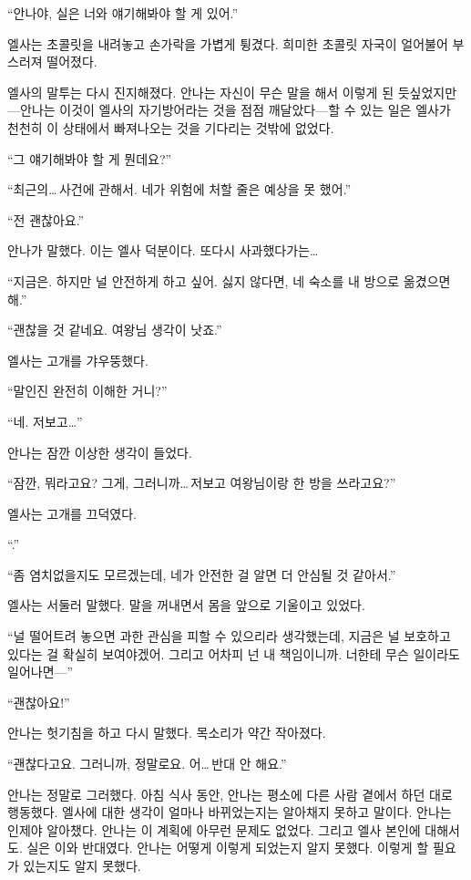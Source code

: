 ``안나야, 실은 너와 얘기해봐야 할 게 있어.''

엘사는 초콜릿을 내려놓고 손가락을 가볍게 튕겼다. 희미한 초콜릿 자국이 얼어불어 부스러져 떨어졌다.

엘사의 말투는 다시 진지해졌다. 안나는 자신이 무슨 말을 해서 이렇게 된 듯싶었지만—안나는 이것이 엘사의 자기방어라는 것을 점점 깨달았다—할 수 있는 일은 엘사가 천천히 이 상태에서 빠져나오는 것을 기다리는 것밖에 없었다.

``그 얘기해봐야 할 게 뭔데요?''

``최근의\ldots\,사건에 관해서. 네가 위험에 처할 줄은 예상을 못 했어.''

``전 괜찮아요.''

안나가 말했다. 이는 엘사 덕분이다. 또다시 사과했다가는\ldots

``지금은. 하지만 널 안전하게 하고 싶어. 싫지 않다면, 네 숙소를 내 방으로 옮겼으면 해.''

``괜찮을 것 같네요. 여왕님 생각이 낫죠.''

엘사는 고개를 갸우뚱했다.

`` 말인진 완전히 이해한 거니?''

``네. 저보고\ldots''

안나는 잠깐 이상한 생각이 들었다.

``잠깐, 뭐라고요? 그게, 그러니까\ldots\,저보고 여왕님이랑 한 방을 쓰라고요?''

엘사는 고개를 끄덕였다.

``.''

``좀 염치없을지도 모르겠는데, 네가 안전한 걸 알면 더 안심될 것 같아서.''

엘사는 서둘러 말했다. 말을 꺼내면서 몸을 앞으로 기울이고 있었다.

``널 떨어트려 놓으면 과한 관심을 피할 수 있으리라 생각했는데, 지금은 널 보호하고 있다는 걸 확실히 보여야겠어. 그리고 어차피 넌 내 책임이니까. 너한테 무슨 일이라도 일어나면—''

``괜찮아요!''

안나는 헛기침을 하고 다시 말했다. 목소리가 약간 작아졌다.

``괜찮다고요. 그러니까, 정말로요. 어\ldots\,반대 안 해요.''

안나는 정말로 그러했다. 아침 식사 동안, 안나는 평소에 다른 사람 곁에서 하던 대로 행동했다. 엘사에 대한 생각이 얼마나 바뀌었는지는 알아채지 못하고 말이다. 안나는 인제야 알아챘다. 안나는 이 계획에 아무런 문제도 없었다. 그리고 엘사 본인에 대해서도. 실은 이와 반대였다. 안나는 어떻게 이렇게 되었는지 알지 못했다. 이렇게 할 필요가 있는지도 알지 못했다.

